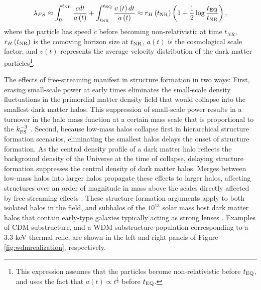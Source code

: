 \begin{equation}
\label{eqn:freestreaming}
\lambda_{FS} \approx \int_{0}^{t_{\rm{NR}}} \frac{c dt}{a\left(t\right)} +  \int_{t_{\rm{NR}}}^{t_{\rm{EQ}}} \frac{v\left(t\right) dt}{a\left(t\right)} \approx r_{H}\left(t_{\rm{NR}}\right) \left(1 +\frac{1}{2} \log \frac{t_{\rm{EQ}}}{t_{\rm{NR}}} \right),
\end{equation}
where the particle has speed $c$ before becoming non-relativistic at time $t_{NR}$, $r_H \left(t_{\rm{NR}}\right)$ is the comoving horizon size at $t_{\rm{NR}}$, $a\left(t\right)$ is the cosmological scale factor, and $v\left(t\right)$ represents the average velocity distribution of the dark matter particles\footnote{This expression assumes that the particles become non-relativistic before $t_{\rm{EQ}}$, and uses the fact that $a\left(t\right)\propto t^{\frac{1}{2}}$ before $t_{\rm{EQ}}$.}. 

The effects of free-streaming manifest in structure formation in two ways: First, erasing small-scale power at early times eliminates the small-scale density fluctuations in the primordial matter density field that would collapse into the smallest dark matter halos. This suppression of small-scale power results in a turnover in the halo mass function at a certain mass scale that is proportional to the $k_{\rm{FS}}^{-3}$ \citep{AvilaReese++01,Schneider++12,Lovell++14}. Second, because low-mass halos collapse first in hierarchical structure formation scenarios, eliminating the smallest halos delays the onset of structure formation. As the central density profile of a dark matter halo reflects the background density of the Universe at the time of collapse, delaying structure formation suppresses the central density of dark matter halos. Merges between low-mass halos into larger halos propagate these effects to larger halos, affecting structures over an order of magnitude in mass above the scales directly affected by free-streaming effects \citep{Navarro++96,Bose++16}. These structure formation arguments apply to both isolated halos in the field, and subhalos of the $10^{13}$ solar mass host dark matter halos that contain early-type galaxies typically acting as strong lenses \citep{Gavazzi++07}. Examples of CDM substructure, and a WDM substructure population corresponding to a 3.3 keV thermal relic, are shown in the left and right panels of Figure \ref{fig:wdmrealization}, respectively. 

